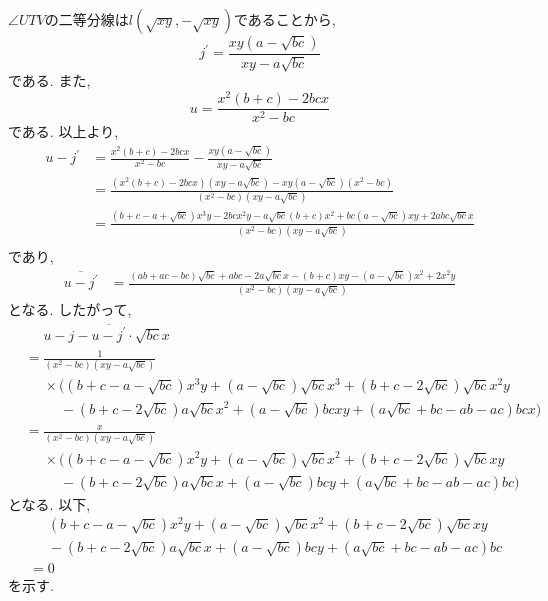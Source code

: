 \begin{ifsol*}
$\angle UTV$の二等分線は$l(\sqrt{xy},-\sqrt{xy})$であることから,
\[j^\prime=\frac{xy(a-\sqrt{bc})}{xy-a\sqrt{bc}}\]
である.
また,
\[u=\frac{x^2(b+c)-2bcx}{x^2-bc}\]
である.
以上より,
\begin{align*}
u-j^\prime
&=\frac{x^2(b+c)-2bcx}{x^2-bc}-\frac{xy(a-\sqrt{bc})}{xy-a\sqrt{bc}}\\
&=\frac{(x^2(b+c)-2bcx)(xy-a\sqrt{bc})-xy(a-\sqrt{bc})(x^2-bc)}{(x^2-bc)(xy-a\sqrt{bc})}\\
&=\frac{(b+c-a+\sqrt{bc})x^3y-2bcx^2y-a\sqrt{bc}(b+c)x^2+bc(a-\sqrt{bc})xy+2abc\sqrt{bc}x}{(x^2-bc)(xy-a\sqrt{bc})}\\
\end{align*}
であり,
\begin{align*}
\overline{u-j^\prime}
&=\frac{(ab+ac-bc)\sqrt{bc}+abc-2a\sqrt{bc}x-(b+c)xy-(a-\sqrt{bc})x^2+2x^2y}{(x^2-bc)(xy-a\sqrt{bc})}
\end{align*}
となる.
したがって,
\begin{align*}
&\phantom{{}={}}u-j-\overline{u-j^\prime}\cdot\sqrt{bc}x\\
&=\frac 1{(x^2-bc)(xy-a\sqrt{bc})}\\
&\phantom{={}}\times\biggl((b+c-a-\sqrt{bc})x^3y+(a-\sqrt{bc})\sqrt{bc}x^3+(b+c-2\sqrt{bc})\sqrt{bc}x^2y\\
&\phantom{=\times\biggl(}-(b+c-2\sqrt{bc})a\sqrt{bc}x^2+(a-\sqrt{bc})bcxy+(a\sqrt{bc}+bc-ab-ac)bcx\biggr)\\
&=\frac x{(x^2-bc)(xy-a\sqrt{bc})}\\
&\phantom{={}}\times\biggl((b+c-a-\sqrt{bc})x^2y+(a-\sqrt{bc})\sqrt{bc}x^2+(b+c-2\sqrt{bc})\sqrt{bc}xy\\
&\phantom{=\times\biggl(}-(b+c-2\sqrt{bc})a\sqrt{bc}x+(a-\sqrt{bc})bcy+(a\sqrt{bc}+bc-ab-ac)bc\biggr)
\end{align*}
となる.
以下,
\begin{align*}
&\phantom{={}}(b+c-a-\sqrt{bc})x^2y+(a-\sqrt{bc})\sqrt{bc}x^2+(b+c-2\sqrt{bc})\sqrt{bc}xy\\
&\phantom{={}}-(b+c-2\sqrt{bc})a\sqrt{bc}x+(a-\sqrt{bc})bcy+(a\sqrt{bc}+bc-ab-ac)bc\\
&=0
\end{align*}
を示す.


\end{ifsol*}
